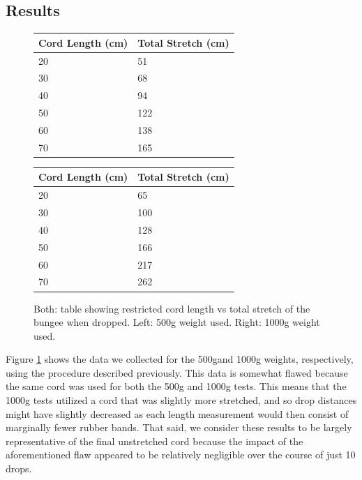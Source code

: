 \documentclass[12pt]{article}
\begin{document}
\subsection{Results}

\begin{figure}[h]
\centering
\begin{tabular}{l|l}
Cord Length (cm) & Total Stretch\footnotemark{} (cm) \\ \hline
20               & 51                 \\
\rowcolor[HTML]{EFEFEF} 
30               & 68                 \\
40               & 94                 \\
\rowcolor[HTML]{EFEFEF} 
50               & 122                \\
60               & 138                \\
\rowcolor[HTML]{EFEFEF} 
70               & 165               
\end{tabular}
\begin{tabular}{l|l}
Cord Length (cm) & Total Stretch (cm) \\ \hline
20               & 65                 \\
\rowcolor[HTML]{EFEFEF} 
30               & 100                \\
40               & 128                \\
\rowcolor[HTML]{EFEFEF} 
50               & 166                \\
60               & 217                \\
\rowcolor[HTML]{EFEFEF} 
70               & 262               
\end{tabular}
\caption{Both: table showing restricted cord length vs total stretch of the bungee when dropped. Left: 500g weight used. Right: 1000g weight used.}
\label{fig:lengthTables}
\end{figure}

Figure \ref{fig:lengthTables} shows the data we collected for the 500g\footnotemark[5] and 1000g weights, respectively, using the procedure described previously. This data is somewhat flawed because the same cord was used for both the 500g and 1000g tests. This means that the 1000g tests utilized a cord that was slightly more stretched, and so drop distances might have slightly decreased as each length measurement would then consist of marginally fewer rubber bands. That said, we consider these results to be largely representative of the final unstretched cord because the impact of the aforementioned flaw appeared to be relatively negligible over the course of just 10 drops.
\end{document}
